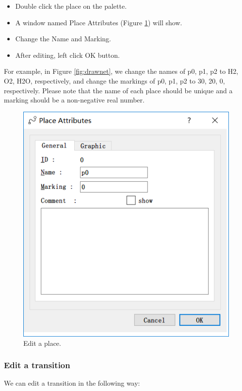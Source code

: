 \documentclass[journal,a4paper,onecolumn]{article}
\begin{document}
\begin{itemize}
	\item Double click the place on the palette.
	\item A window named Place Attributes (Figure \ref{fig:editplace}) will show.
	\item Change the Name and Marking.
	\item After editing, left click OK button.
\end{itemize}

For example, in Figure \ref{fig:drawnet}, we change the names of p0, p1, p2 to H2, O2, H2O, respectively, and change the markings of p0, p1, p2 to 30, 20, 0, respectively. Please note that the name of each place should be unique and a marking should be a non-negative real number.

\begin{figure}[!hbt]
	\begin{center}
		\includegraphics[width=\columnwidth]{fig3}
		\caption{Edit a place.}
		\label{fig:editplace}
	\end{center}
\end{figure}


\subsubsection{Edit a transition}
We can edit a transition in the following way:
\end{document}
